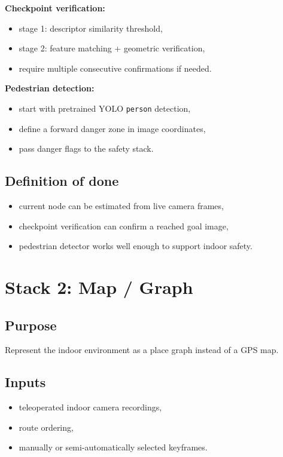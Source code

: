 \documentclass[11pt,a4paper]{article}
\begin{document}
\textbf{Checkpoint verification:}
\begin{itemize}[nosep]
  \item stage 1: descriptor similarity threshold,
  \item stage 2: feature matching + geometric verification,
  \item require multiple consecutive confirmations if needed.
\end{itemize}

\textbf{Pedestrian detection:}
\begin{itemize}[nosep]
  \item start with pretrained YOLO \texttt{person} detection,
  \item define a forward danger zone in image coordinates,
  \item pass danger flags to the safety stack.
\end{itemize}

\subsection{Definition of done}

\begin{itemize}[nosep]
  \item current node can be estimated from live camera frames,
  \item checkpoint verification can confirm a reached goal image,
  \item pedestrian detector works well enough to support indoor safety.
\end{itemize}


\section{Stack 2: Map / Graph}

\subsection{Purpose}

Represent the indoor environment as a place graph instead of a GPS map.

\subsection{Inputs}

\begin{itemize}[nosep]
  \item teleoperated indoor camera recordings,
  \item route ordering,
  \item manually or semi-automatically selected keyframes.
\end{itemize}
\end{document}
